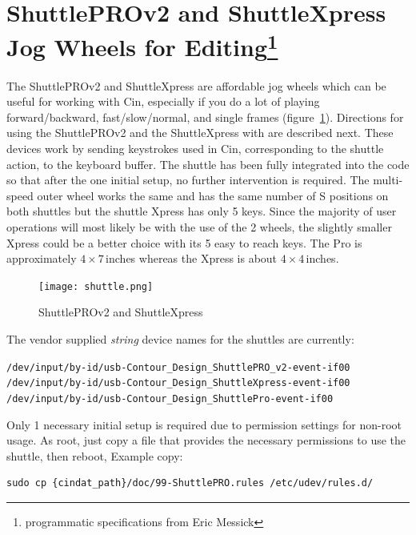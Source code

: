 \section[ShuttlePROv2 and ShuttleXpress Jog Wheels for Editing]{ShuttlePROv2 and ShuttleXpress Jog Wheels for Editing\protect\footnote{programmatic specifications from Eric Messick}}%
\label{sec:shuttle_jog_wheels_editing}

The ShuttlePROv2 and ShuttleXpress are affordable jog wheels which
can be useful for working with Cin, especially if you do a lot of
playing forward/backward, fast/slow/normal, and single frames
(figure~\ref{fig:shuttle}).
%
Directions for using the ShuttlePROv2 and the ShuttleXpress with
\CGG{} are described next. These devices work by sending keystrokes
used in Cin, corresponding to the shuttle action, to the keyboard
buffer. The shuttle has been fully integrated into the \CGG{} code
so that after the one initial setup, no further intervention is
required.  The multi-speed outer wheel works the same and has the
same number of S positions on both shuttles but the shuttle Xpress
has only 5 keys.  Since the majority of user operations will most
likely be with the use of the 2 wheels, the slightly smaller Xpress
could be a better choice with its 5 easy to reach keys.  The Pro is
approximately $4\times7$\,inches whereas the Xpress is about
$4\times4$\,inches.

\begin{figure}[htpb]
  \centering
  \texttt{[image: shuttle.png]}
  \caption{ShuttlePROv2 and ShuttleXpress}
  \label{fig:shuttle}
\end{figure}

The vendor supplied \textit{string} device names for the shuttles
are currently:

\texttt{/dev/input/by-id/usb-Contour\_Design\_ShuttlePRO\_v2-event-if00}\\
\texttt{/dev/input/by-id/usb-Contour\_Design\_ShuttleXpress-event-if00}\\
\texttt{/dev/input/by-id/usb-Contour\_Design\_ShuttlePro-event-if00}

Only 1 necessary initial setup is required due to permission
settings for non-root usage. As root, just copy a file that provides
the necessary permissions to use the shuttle, then reboot, Example
copy:

\begin{lstlisting}[style=sh]
sudo cp {cindat_path}/doc/99-ShuttlePRO.rules /etc/udev/rules.d/
\end{lstlisting}

